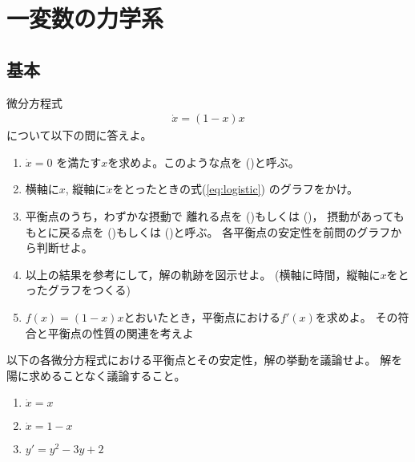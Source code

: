 \documentclass[twocolumn,11pt]{jarticle}
\begin{document}
\pagestyle{empty}


\setcounter{page}{1}
\pagestyle{fancy}

\section{一変数の力学系}
\subsection{基本}

\nquestion
微分方程式
\begin{align}
  \label{eq:logistic}
  \dot{x}=(1-x)x
\end{align}
について以下の問に答えよ。

\begin{enumerate}
\item $\dot{x}=0$ を満たす$x$を求めよ。このような点を
()と呼ぶ。
\item 横軸に$x$, 縦軸に$\dot{x}$をとったときの式(\ref{eq:logistic})
  のグラフをかけ。
\item 
  平衡点のうち，わずかな摂動で
  離れる点を
  ()もしくは 
(\nmindex{})，
  摂動があってももとに戻る点を
  ()もしくは
()と呼ぶ。
  各平衡点の安定性を前問のグラフから判断せよ。
\item 以上の結果を参考にして，解の軌跡を図示せよ。
  (横軸に時間，縦軸に$x$をとったグラフをつくる) 
\item $f(x)=(1-x)x$とおいたとき，平衡点における$f'(x)$を求めよ。
  その符合と平衡点の性質の関連を考えよ
\end{enumerate}

\nquestion
以下の各微分方程式における平衡点とその安定性，解の挙動を議論せよ。
解を陽に求めることなく議論すること。
\begin{enumerate}
\item $\dot{x}=x$
\item $\dot{x}=1-x$
\item $y'=y^2-3y+2$
\end{enumerate}
\end{document}
